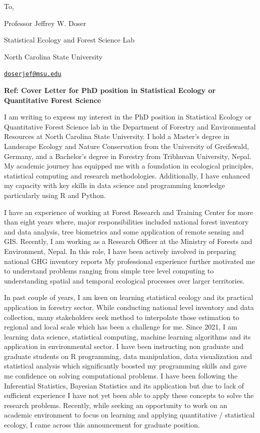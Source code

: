 \documentclass[
]{article}
\author{}
\date{\vspace{-2.5em}}
\begin{document}

To,

Professor Jeffrey W. Doser

Statistical Ecology and Forest Science Lab

North Carolina State University

\href{mailto:doserjef@msu.edu}{\nolinkurl{doserjef@msu.edu}}

\begin{centering}

\vspace{0.5cm}

\bf{Ref: Cover Letter for PhD position in Statistical Ecology or Quantitative Forest Science}

\end{centering}

I am writing to express my interest in the PhD position in Statistical
Ecology or Quantitative Forest Science lab in the Department of Forestry
and Environmental Resources at North Carolina State University. I hold a
Master's degree in Landscape Ecology and Nature Conservation from the
University of Greifswald, Germany, and a Bachelor's degree in Forestry
from Tribhuvan University, Nepal. My academic journey has equipped me
with a foundation in ecological principles, statistical computing and
research methodologies. Additionally, I have enhanced my capacity with
key skills in data science and programming knowledge particularly using
R and Python.

I have an experience of working at Forest Research and Training Center
for more than eight years where, major responsibilities included
national forest inventory and data analysis, tree biometrics and some
application of remote sensing and GIS. Recently, I am working as a
Research Officer at the Ministry of Forests and Environment, Nepal. In
this role, I have been actively involved in preparing national GHG
inventory reports My professional experience further motivated me to
understand problems ranging from simple tree level computing to
understanding spatial and temporal ecological processes over larger
territories.

In past couple of years, I am keen on learning statistical ecology and
its practical application in forestry sector. While conducting national
level inventory and data collection, many stakeholders seek method to
interpolate those estimation to regional and local scale which has been
a challenge for me. Since 2021, I am learning data science, statistical
computing, machine learning algorithms and its application in
environmental sector. I have been instructing non graduate and graduate
students on R programming, data manipulation, data visualization and
statistical analysis which significantly boosted my programming skills
and gave me confidence on solving computational problems. I have been
following the Inferential Statistics, Bayesian Statistics and its
application but due to lack of sufficient experience I have not yet been
able to apply these concepts to solve the research problems. Recently,
while seeking an opportunity to work on an academic environment to focus
on learning and applying quantitative / statistical ecology, I came
across this announcement for graduate position.
\end{document}
